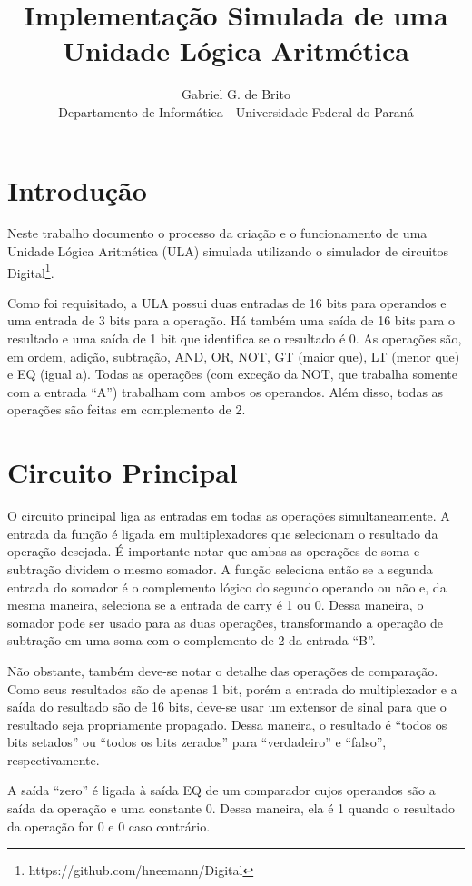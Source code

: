 \documentclass[twocolumn]{article}
\author{Gabriel G. de Brito\\ Departamento de Informática - Universidade Federal do Paraná}
\title{Implementação Simulada de uma Unidade Lógica Aritmética}
\begin{document}
\maketitle

\section{Introdução}

Neste trabalho documento o processo da criação e o funcionamento de uma Unidade
Lógica Aritmética (ULA) simulada utilizando o simulador de circuitos
Digital\footnote{https://github.com/hneemann/Digital}.

Como foi requisitado, a ULA possui duas entradas de 16 bits para operandos e uma
entrada de 3 bits para a operação. Há também uma saída de 16 bits para o
resultado e uma saída de 1 bit que identifica se o resultado é 0. As operações
são, em ordem, adição, subtração, AND, OR, NOT, GT (maior que), LT (menor que) e
EQ (igual a). Todas as operações (com exceção da NOT, que trabalha somente com a
entrada ``A'') trabalham com ambos os operandos. Além disso, todas as operações
são feitas em complemento de 2.

\section{Circuito Principal}

O circuito principal liga as entradas em todas as operações simultaneamente. A
entrada da função é ligada em multiplexadores que selecionam o resultado da
operação desejada. É importante notar que ambas as operações de soma e subtração
dividem o mesmo somador. A função seleciona então se a segunda entrada do
somador é o complemento lógico do segundo operando ou não e, da mesma maneira,
seleciona se a entrada de carry é 1 ou 0. Dessa maneira, o somador pode ser
usado para as duas operações, transformando a operação de subtração em uma soma
com o complemento de 2 da entrada ``B''.

Não obstante, também deve-se notar o detalhe das operações de comparação. Como
seus resultados são de apenas 1 bit, porém a entrada do multiplexador e a saída
do resultado são de 16 bits, deve-se usar um extensor de sinal para que o
resultado seja propriamente propagado. Dessa maneira, o resultado é ``todos os
bits setados'' ou ``todos os bits zerados'' para ``verdadeiro'' e ``falso'',
respectivamente.

A saída ``zero'' é ligada à saída EQ de um comparador cujos operandos são a
saída da operação e uma constante 0. Dessa maneira, ela é 1 quando o resultado
da operação for 0 e 0 caso contrário.
\end{document}

